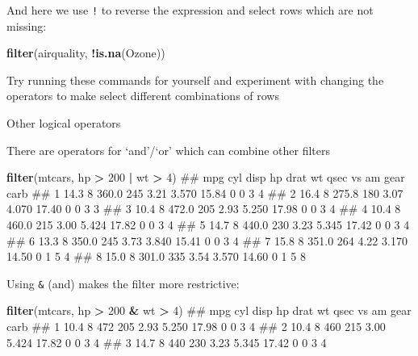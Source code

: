 \documentclass[]{article}
\newenvironment{Shaded}{\begin{snugshade}}{\end{snugshade}}
\newcommand{\KeywordTok}[1]{\textcolor[rgb]{0.13,0.29,0.53}{\textbf{#1}}}
\newcommand{\DecValTok}[1]{\textcolor[rgb]{0.00,0.00,0.81}{#1}}
\newcommand{\StringTok}[1]{\textcolor[rgb]{0.31,0.60,0.02}{#1}}
\newcommand{\OperatorTok}[1]{\textcolor[rgb]{0.81,0.36,0.00}{\textbf{#1}}}
\newcommand{\NormalTok}[1]{#1}
\theoremstyle{definition}
\theoremstyle{definition}
\theoremstyle{definition}
\theoremstyle{remark}
\begin{document}
And here we use \texttt{!} to reverse the expression and select rows
which are not missing:

\begin{Shaded}
\begin{Highlighting}[]
\KeywordTok{filter}\NormalTok{(airquality, }\OperatorTok{!}\KeywordTok{is.na}\NormalTok{(Ozone))}
\end{Highlighting}
\end{Shaded}

{Try running these commands for yourself and experiment with changing
the operators to make select different combinations of rows}

Other logical operators

There are operators for `and'/`or' which can combine other filters

\begin{Shaded}
\begin{Highlighting}[]
\KeywordTok{filter}\NormalTok{(mtcars, hp }\OperatorTok{>}\StringTok{ }\DecValTok{200} \OperatorTok{|}\StringTok{ }\NormalTok{wt }\OperatorTok{>}\StringTok{ }\DecValTok{4}\NormalTok{)}
\NormalTok{##    mpg cyl  disp  hp drat    wt  qsec vs am gear carb}
\NormalTok{## 1 14.3   8 360.0 245 3.21 3.570 15.84  0  0    3    4}
\NormalTok{## 2 16.4   8 275.8 180 3.07 4.070 17.40  0  0    3    3}
\NormalTok{## 3 10.4   8 472.0 205 2.93 5.250 17.98  0  0    3    4}
\NormalTok{## 4 10.4   8 460.0 215 3.00 5.424 17.82  0  0    3    4}
\NormalTok{## 5 14.7   8 440.0 230 3.23 5.345 17.42  0  0    3    4}
\NormalTok{## 6 13.3   8 350.0 245 3.73 3.840 15.41  0  0    3    4}
\NormalTok{## 7 15.8   8 351.0 264 4.22 3.170 14.50  0  1    5    4}
\NormalTok{## 8 15.0   8 301.0 335 3.54 3.570 14.60  0  1    5    8}
\end{Highlighting}
\end{Shaded}

Using \texttt{\&} (and) makes the filter more restrictive:

\begin{Shaded}
\begin{Highlighting}[]
\KeywordTok{filter}\NormalTok{(mtcars, hp }\OperatorTok{>}\StringTok{ }\DecValTok{200} \OperatorTok{&}\StringTok{ }\NormalTok{wt }\OperatorTok{>}\StringTok{ }\DecValTok{4}\NormalTok{)}
\NormalTok{##    mpg cyl disp  hp drat    wt  qsec vs am gear carb}
\NormalTok{## 1 10.4   8  472 205 2.93 5.250 17.98  0  0    3    4}
\NormalTok{## 2 10.4   8  460 215 3.00 5.424 17.82  0  0    3    4}
\NormalTok{## 3 14.7   8  440 230 3.23 5.345 17.42  0  0    3    4}
\end{Highlighting}
\end{Shaded}
\end{document}
